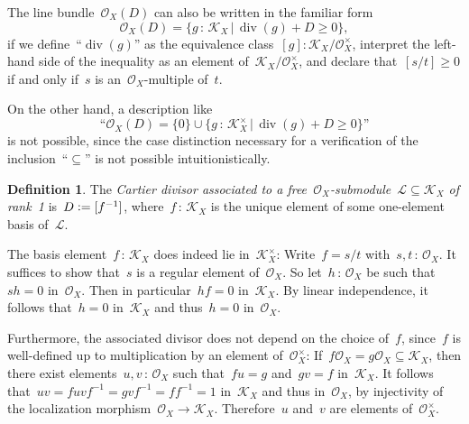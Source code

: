 \documentclass[10pt,reqno,a4paper]{amsbook}
\makeatletter
\theoremstyle{definition}
\newtheorem{defn}{Definition}[section]
\theoremstyle{plain}
\newtheorem{prop}[defn]{Proposition}
\theoremstyle{remark}
\renewcommand{\O}{\mathcal{O}}
\newcommand{\K}{\mathcal{K}}
\renewcommand{\L}{\mathcal{L}}
\newcommand{\?}{\,{:}\,}
\renewcommand{\_}{\mathpunct{.}\,}
\newcommand{\effective}{ef{}fective\xspace}
\newcommand{\defeq}{\vcentcolon=}
\renewenvironment{proof}[1][\proofname]{\par
  \pushQED{\qed}%
  \normalfont \topsep6\p@\@plus6\p@\relax
  \trivlist
  \item[\hskip\labelsep
        \itshape
    #1\@addpunct{.}]\ignorespaces
}{%
  \popQED\endtrivlist\@endpefalse
}
\makeatother
\begin{document}
The line bundle~$\O_X(D)$ can also be written in the familiar form
\[ \O_X(D) = \{ g \? \K_X \,|\, \operatorname{div}(g) + D \geq 0 \}, \]
if we define~``$\operatorname{div}(g)$'' as the equivalence class~$[g] :
\K_X/\O_X^\times$, interpret the left-hand side of the inequality as an element
of~$\K_X/\O_X^\times$, and declare that~$[s/t] \geq 0$ if and only if~$s$ is
an~$\O_X$-multiple of~$t$.

On the other hand, a description like
\[ \text{``$\O_X(D) = \{ 0 \} \cup \{ g \? \K_X^\times \,|\,
  \operatorname{div}(g) + D \geq 0 \}$''} \]
is not possible, since the case distinction necessary for a verification of the
inclusion~``$\subseteq$'' is not possible intuitionistically.


\begin{defn}The \emph{Cartier divisor associated to a free~$\O_X$-submodule~$\L \subseteq
\K_X$ of rank~1} is~$D \defeq [f^{-1}]$, where~$f\?\K_X$ is the unique element of
some one-element basis of~$\L$.\end{defn}

The basis element~$f\?\K_X$ does indeed lie in~$\K_X^\times$: Write~$f
= s/t$ with~$s,t \? \O_X$. It suffices to show that~$s$ is a regular element
of~$\O_X$. So let~$h\?\O_X$ be such that~$sh = 0$ in~$\O_X$. Then in
particular~$hf = 0$ in~$\K_X$. By linear independence, it follows that~$h = 0$
in~$\K_X$ and thus~$h = 0$ in~$\O_X$.

Furthermore, the associated divisor does not depend on the choice of~$f$,
since~$f$ is well-defined up to multiplication by an element of~$\O_X^\times$: If~$f
\O_X = g \O_X \subseteq \K_X$, then there exist elements~$u,v\?\O_X$ such that~$fu = g$
and~$gv = f$ in~$\K_X$. It follows that~$uv = fuvf^{-1} = gvf^{-1} = ff^{-1} =
1$ in~$\K_X$ and thus in~$\O_X$, by injectivity of the localization morphism~$\O_X \to
\K_X$. Therefore~$u$ and~$v$ are elements of~$\O_X^\times$.
\end{document}
